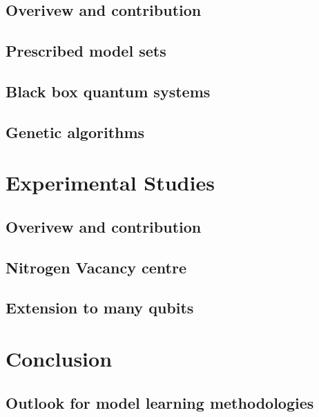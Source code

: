     \chapter*{Overivew and contribution}
        
    \chapter{Prescribed model sets}\label{chapter:lattices}
        
    \chapter{Black box quantum systems}\label{chapter:black_box}
        
    \chapter{Genetic algorithms}\label{chapter:ga}
        

\part{Experimental Studies}\label{part:experimental_study}
    \chapter*{Overivew and contribution}
        
    \chapter{Nitrogen Vacancy centre}\label{chapter:nv}
        
    \chapter{Extension to many qubits}\label{chapter:many_qubits}
        
    
\part{Conclusion}\label{part:conclusion}
    \chapter{Outlook for model learning methodologies}\label{chapter:outlook}
        



